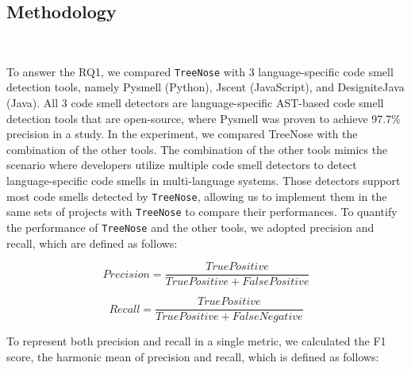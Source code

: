 


\subsection{Methodology}~\label{sec:methodology}

To answer the RQ1, we compared \texttt{TreeNose} with 3 language-specific code
smell detection tools, namely Pysmell \cite{Pysmell} (Python), Jscent
\cite{Jscent} (JavaScript), and DesigniteJava \cite{DesigniteJava} (Java). All
3 code smell detectors are language-specific AST-based code smell detection
tools that are open-source, where Pysmell was proven to achieve 97.7\%
precision in a study. In the experiment, we compared TreeNose with the
combination of the other tools. The combination of the other tools mimics the
scenario where developers utilize multiple code smell detectors to detect
language-specific code smells in multi-language systems. Those detectors
support most code smells detected by \texttt{TreeNose}, allowing us to
implement them in the same sets of projects with \texttt{TreeNose} to compare
their performances. To quantify the performance of \texttt{TreeNose} and the
other tools, we adopted precision and recall, which are defined as follows:

\vspace{-1.5em}

\begin{equation}
    Precision = \frac{True Positive}{True Positive + False Positive}
\end{equation}

\begin{equation}
    Recall = \frac{True Positive}{True Positive + False Negative}
\end{equation}

To represent both precision and recall in a single metric, we calculated the F1
score, the harmonic mean of precision and recall, which is defined as follows:

